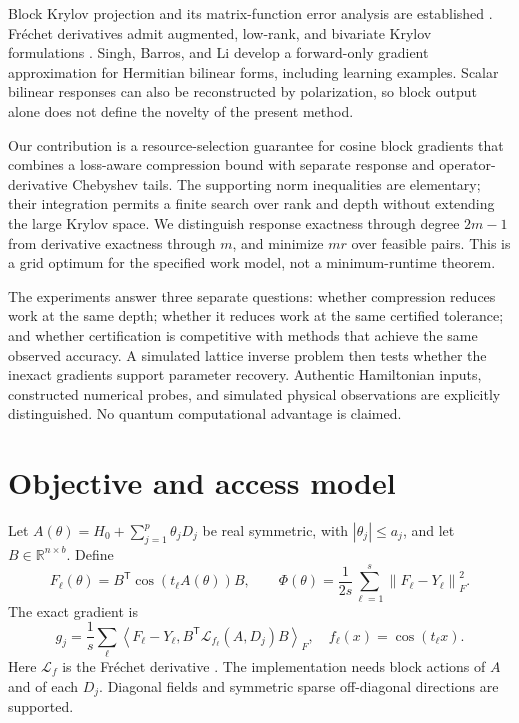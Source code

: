 \documentclass[10pt,letterpaper,twoside]{article}
\newcommand{\RR}{\mathbb{R}}
\newcommand{\norm}[1]{\left\lVert #1\right\rVert}
\newcommand{\ip}[2]{\left\langle #1,#2\right\rangle_F}
\newcommand{\Lfrechet}{\mathcal{L}}
\begin{document}
Block Krylov projection and its matrix-function error analysis are established
\cite{gutknecht2007,xu2022,chen2022}. Fr\'echet derivatives admit augmented,
low-rank, and bivariate Krylov formulations
\cite{kandolf2017,kandolf2021,kressner2019}. Singh, Barros, and Li
\cite{singh2026} develop a forward-only gradient approximation for Hermitian
bilinear forms, including learning examples. Scalar bilinear responses can
also be reconstructed by polarization, so block output alone does not define
the novelty of the present method.

Our contribution is a resource-selection guarantee for cosine block gradients
that combines a loss-aware compression bound with separate response and
operator-derivative Chebyshev tails. The supporting norm inequalities are
elementary; their integration permits a finite search
over rank and depth without extending the large Krylov space. We distinguish
response exactness through degree $2m-1$ from derivative exactness through
$m$, and minimize $mr$ over feasible pairs. This is a grid optimum for the
specified work model, not a minimum-runtime theorem.

The experiments answer three separate questions: whether compression reduces
work at the same depth; whether it reduces work at the same certified tolerance;
and whether certification is competitive with methods that achieve the same
observed accuracy. A simulated lattice inverse problem then tests whether the
inexact gradients support parameter recovery. Authentic Hamiltonian inputs,
constructed numerical probes, and simulated physical observations are explicitly
distinguished. No quantum computational advantage is claimed.

\section{Objective and access model}
Let $A(\theta)=H_0+\sum_{j=1}^p\theta_jD_j$ be real symmetric, with
$|\theta_j|\le a_j$, and let $B\in\RR^{n\times b}$. Define
\begin{equation}
 F_\ell(\theta)=B^{\mathsf T}\cos(t_\ell A(\theta))B,\qquad
 \Phi(\theta)=\frac1{2s}\sum_{\ell=1}^s\norm{F_\ell-Y_\ell}_F^2.
 \label{eq:objective}
\end{equation}
The exact gradient is
\begin{equation}
 g_j=\frac1s\sum_\ell\ip{F_\ell-Y_\ell}
 {B^{\mathsf T}\Lfrechet_{f_\ell}(A,D_j)B},\quad f_\ell(x)=\cos(t_\ell x).
 \label{eq:gradient}
\end{equation}
Here $\Lfrechet_f$ is the Fr\'echet derivative \cite{higham2008,al-mohy2009}.
The implementation needs block actions of $A$ and of each $D_j$. Diagonal
fields and symmetric sparse off-diagonal directions are supported.
\end{document}
